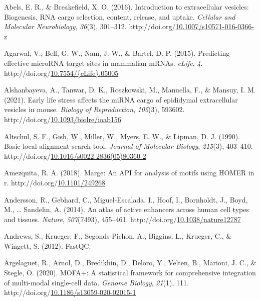 \documentclass[12pt,twoside]{reedthesis}
\newlength{\cslhangindent}
\newenvironment{CSLReferences}[2] %
 {%
  \setlength{\parindent}{0pt}
  \ifodd #1 \everypar{\setlength{\hangindent}{\cslhangindent}}\ignorespaces\fi
  \ifnum #2 > 0
  \setlength{\parskip}{#2\baselineskip}
  \fi
 }%
 {}
\begin{document}
\hypertarget{refs}{}
\begin{CSLReferences}{1}{0}
\leavevmode{}%
Abels, E. R., \& Breakefield, X. O. (2016). Introduction to extracellular vesicles: Biogenesis, RNA cargo selection, content, release, and uptake. \emph{Cellular and Molecular Neurobiology}, \emph{36}(3), 301--312. http://doi.org/\href{https://doi.org/10.1007/s10571-016-0366-z}{10.1007/s10571-016-0366-z}

\leavevmode{}%
Agarwal, V., Bell, G. W., Nam, J.-W., \& Bartel, D. P. (2015). Predicting effective {microRNA} target sites in mammalian {mRNAs}. \emph{eLife}, \emph{4}. http://doi.org/\href{https://doi.org/10.7554/\%7BeLife\%7D.05005}{10.7554/\{eLife\}.05005}

\leavevmode{}%
Alshanbayeva, A., Tanwar, D. K., Roszkowski, M., Manuella, F., \& Mansuy, I. M. (2021). Early life stress affects the miRNA cargo of epididymal extracellular vesicles in mouse{\textdagger}. \emph{Biology of Reproduction}, \emph{105}(3), 593602. http://doi.org/\href{https://doi.org/10.1093/biolre/ioab156}{10.1093/biolre/ioab156}

\leavevmode{}%
Altschul, S. F., Gish, W., Miller, W., Myers, E. W., \& Lipman, D. J. (1990). Basic local alignment search tool. \emph{Journal of Molecular Biology}, \emph{215}(3), 403--410. http://doi.org/\href{https://doi.org/10.1016/s0022-2836(05)80360-2}{10.1016/s0022-2836(05)80360-2}

\leavevmode{}%
Amezquita, R. A. (2018). Marge: An API for analysis of motifs using HOMER in r. http://doi.org/\href{https://doi.org/10.1101/249268}{10.1101/249268}

\leavevmode{}%
Andersson, R., Gebhard, C., Miguel-Escalada, I., Hoof, I., Bornholdt, J., Boyd, M., \ldots{} Sandelin, A. (2014). An atlas of active enhancers across human cell types and tissues. \emph{Nature}, \emph{507}(7493), 455--461. http://doi.org/\href{https://doi.org/10.1038/nature12787}{10.1038/nature12787}

\leavevmode{}%
Andrews, S., Krueger, F., Segonds-Pichon, A., Biggins, L., Krueger, C., \& Wingett, S. (2012). FastQC.

\leavevmode{}%
Argelaguet, R., Arnol, D., Bredikhin, D., Deloro, Y., Velten, B., Marioni, J. C., \& Stegle, O. (2020). MOFA+: A statistical framework for comprehensive integration of multi-modal single-cell data. \emph{Genome Biology}, \emph{21}(1), 111. http://doi.org/\href{https://doi.org/10.1186/s13059-020-02015-1}{10.1186/s13059-020-02015-1}


\end{CSLReferences}
\end{document}
